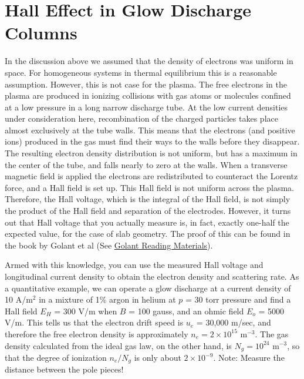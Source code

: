 \documentclass{../lab}
\begin{document}
\section{Hall Effect in Glow Discharge Columns}

In the discussion above we assumed that the density of electrons was uniform in space. For homogeneous systems in thermal equilibrium this is a reasonable assumption. However, this is not case for the plasma. The free electrons in the plasma are produced in ionizing collisions with gas atoms or molecules confined at a low pressure in a long narrow discharge tube. At the low current densities under consideration here, recombination of the charged particles takes place almost exclusively at the tube walls. This means that the electrons (and positive ions) produced in the gas must find their ways to the walls before they disappear. The resulting electron density distribution is not uniform, but has a maximum in the center of the tube, and falls nearly to zero at the walls. When a transverse magnetic field is applied the electrons are redistributed to counteract the Lorentz force, and a Hall field is set up. This Hall field is not uniform across the plasma. Therefore, the Hall voltage, which is the integral of the Hall field, is not simply the product of the Hall field and separation of the electrodes. However, it turns out that Hall voltage that you actually measure is, in fact, exactly one-half the expected value, for the case of slab geometry. The proof of this can be found in the book by Golant et al (See \hyperref[sec:BeforeFirstDay]{Golant Reading Materials}).

Armed with this knowledge, you can use the measured Hall voltage and longitudinal current density to obtain the electron density and scattering rate. As a quantitative example, we can operate a glow discharge at a current density of 10 A/m$^2$ in a mixture of 1\% argon in helium at $p$ = 30 torr pressure and find a Hall field $E_H$ = 300 V/m when $B$ = 100 gauss, and an ohmic field $E_o$ = 5000 V/m. This tells us that the electron drift speed is $u_e$ = 30,000 m/sec, and therefore the free electron density is approximately $n_e = 2 \times 10^{15}$ m$^{-3}$. The gas density calculated from the ideal gas law, on the other hand, is $N_g = 10^{24}$ m$^{-3}$, so that the degree of ionization $n_e/N_g$ is only about $2 \times 10^{-9}$. Note: Measure the distance between the pole pieces!
\end{document}
